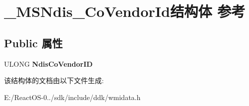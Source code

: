 \hypertarget{struct___m_s_ndis___co_vendor_id}{}\section{\+\_\+\+M\+S\+Ndis\+\_\+\+Co\+Vendor\+Id结构体 参考}
\label{struct___m_s_ndis___co_vendor_id}
\subsection*{Public 属性}
\begin{DoxyCompactItemize}
\item 
\mbox{\label{struct___m_s_ndis___co_vendor_id_a9be6887da2103a3ade38de9758195c58}} 
U\+L\+O\+NG {\bfseries Ndis\+Co\+Vendor\+ID}
\end{DoxyCompactItemize}


该结构体的文档由以下文件生成\+:\begin{DoxyCompactItemize}
\item 
E\+:/\+React\+O\+S-\/0../sdk/include/ddk/wmidata.\+h\end{DoxyCompactItemize}
